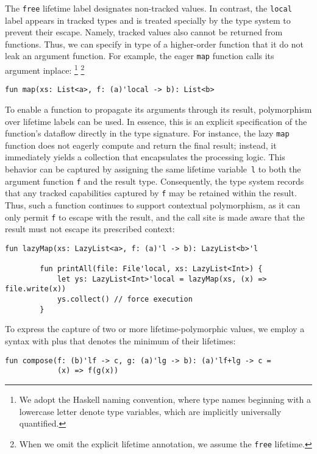 \documentclass[11pt]{article}
\begin{document}
    The \lstinline[language=colang]|free| lifetime label designates non-tracked values.
    In contrast, the \lstinline[language=colang]|local| label appears in tracked types and is treated specially by the type system to prevent their escape.
    Namely, tracked values also cannot be returned from functions.
    Thus, we can specify in type of a higher-order function that it do not leak an argument function.
    For example, the eager \lstinline[language=colang]|map| function calls its argument inplace:%
    \footnote{We adopt the Haskell naming convention, where type names beginning with a lowercase letter denote type variables, which are implicitly universally quantified.}%
    \footnote{When we omit the explicit lifetime annotation, we assume the \lstinline[language=colang]|free| lifetime.}
    \begin{lstlisting}[language=colang]
        fun map(xs: List<a>, f: (a)'local -> b): List<b>
    \end{lstlisting}

    To enable a function to propagate its arguments through its result, polymorphism over lifetime labels can be used.
    In essence, this is an explicit specification of the function’s dataflow directly in the type signature.
    For instance, the lazy \lstinline[language=colang]|map| function does not eagerly compute and return the final result; instead, it immediately yields a collection that encapsulates the processing logic.
    This behavior can be captured by assigning the same lifetime variable~\lstinline[language=colang]|l| to both the argument function \lstinline[language=colang]|f| and the result type.
    Consequently, the type system records that any tracked capabilities captured by \lstinline[language=colang]|f| may be retained within the result.
    Thus, such a function continues to support contextual polymorphism, as it can only permit \texttt{f} to escape with the result, and the call site is made aware that the result must not escape its prescribed context:
    \begin{lstlisting}[language=colang]
        fun lazyMap(xs: LazyList<a>, f: (a)'l -> b): LazyList<b>'l

        fun printAll(file: File'local, xs: LazyList<Int>) {
            let ys: LazyList<Int>'local = lazyMap(xs, (x) => file.write(x))
            ys.collect() // force execution
        }
    \end{lstlisting}

    To express the capture of two or more lifetime-polymorphic values, we employ a syntax with plus that denotes the minimum of their lifetimes:
    \begin{lstlisting}[language=colang]
        fun compose(f: (b)'lf -> c, g: (a)'lg -> b): (a)'lf+lg -> c =
            (x) => f(g(x))
    \end{lstlisting}
\end{document}

